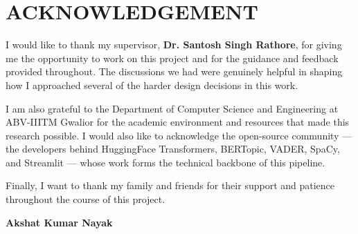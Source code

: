 \newpage
\section*{ACKNOWLEDGEMENT}

\begin{justify}
\noindent I would like to thank my supervisor, \textbf{Dr. Santosh Singh Rathore}, for giving me the opportunity to work on this project and for the guidance and feedback provided throughout. The discussions we had were genuinely helpful in shaping how I approached several of the harder design decisions in this work.

\noindent I am also grateful to the Department of Computer Science and Engineering at ABV-IIITM Gwalior for the academic environment and resources that made this research possible. I would also like to acknowledge the open-source community — the developers behind HuggingFace Transformers, BERTopic, VADER, SpaCy, and Streamlit — whose work forms the technical backbone of this pipeline.

\noindent Finally, I want to thank my family and friends for their support and patience throughout the course of this project.
\end{justify}

\textbf{Akshat Kumar Nayak}\\

